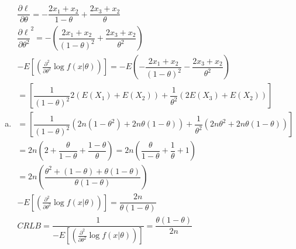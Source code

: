 \documentclass{article}
\newcommand{\pderiv}[2]{\frac{\partial #1}{\partial #2}}
\newcommand{\dll}[1]{\dfrac{\partial\ell}{\partial{#1}}}
\newcommand{\ta}{\theta}
\begin{document}
\begin{flushleft}
\begin{enumerate}[(a)]
	\item 
\begin{multline*}\\
\dll{\theta}=-\dfrac{2x_1+x_2}{1-\ta}+\dfrac{2x_3+x_2}{\ta}\\
\dll{\ta^2}^2=-\left(\dfrac{2x_1+x_2}{(1-\ta)^2}+\dfrac{2x_3+x_2}{\ta^2}\right)\\
-E[(\pderiv{^2}{\theta^2}\log f(x|\theta))]=-E\left(-\dfrac{2x_1+x_2}{(1-\ta)^2}-\dfrac{2x_3+x_2}{\ta^2}\right)\\
=\left[\dfrac{1}{(1-\ta)^2}2(E(X_1)+E(X_2))+\dfrac{1}{\ta^2}(2E(X_3)+E(X_2))\right]\\
=\left[\dfrac{1}{(1-\ta)^2}(2n(1-\theta^2)+2n\ta(1-\ta))+\dfrac{1}{\ta^2}(2n\ta^2+2n\ta(1-\ta))\right]\\
=2n\left(2+\dfrac{\ta}{1-\ta}+\dfrac{1-\ta}{\ta}\right)=2n\left(\dfrac{\ta}{1-\ta}+\dfrac{1}{\ta}+1\right)\\
=2n\left(\dfrac{\ta^2+(1-\ta)+\ta(1-\ta)}{\ta(1-\ta)}\right)\\
-E[(\pderiv{^2}{\theta^2}\log f(x|\theta))]=\dfrac{2n}{\ta(1-\ta)}\\
CRLB=\dfrac{1}{-E[(\pderiv{^2}{\theta^2}\log f(x|\theta))]}=\dfrac{\ta(1-\ta)}{2n}\\
\end{multline*}


\end{enumerate}
\end{flushleft}
\end{document}
